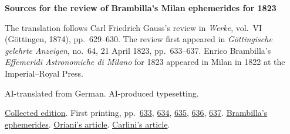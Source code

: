 \clearpage\thispagestyle{empty}
\begin{center}\Large\bfseries Sources for the review of Brambilla’s Milan ephemerides for 1823\end{center}

The translation follows Carl Friedrich Gauss’s review in \emph{Werke}, vol.~VI (Göttingen, 1874), pp.~629--630. The review first appeared in \emph{Göttingische gelehrte Anzeigen}, no.~64, 21 April 1823, pp.~633--637. Enrico Brambilla’s \emph{Effemeridi Astronomiche di Milano} for 1823 appeared in Milan in 1822 at the Imperial--Royal Press.

AI-translated from German. AI-produced typesetting.

\href{https://gdz.sub.uni-goettingen.de/id/PPN236007467}{Collected edition}. First printing, pp.~\href{https://images.p.sub.uni-goettingen.de/iiif/image/gdz:PPN385030444_1823_1:00000639/full/1650,/0/default.jpg}{633}, \href{https://images.p.sub.uni-goettingen.de/iiif/image/gdz:PPN385030444_1823_1:00000640/full/1650,/0/default.jpg}{634}, \href{https://images.p.sub.uni-goettingen.de/iiif/image/gdz:PPN385030444_1823_1:00000641/full/1650,/0/default.jpg}{635}, \href{https://images.p.sub.uni-goettingen.de/iiif/image/gdz:PPN385030444_1823_1:00000642/full/1650,/0/default.jpg}{636}, \href{https://images.p.sub.uni-goettingen.de/iiif/image/gdz:PPN385030444_1823_1:00000643/full/1650,/0/default.jpg}{637}. \href{https://books.google.it/books?id=yKIAAAAAMAAJ&pg=PP5}{Brambilla’s ephemerides}. \href{https://books.google.it/books?id=yKIAAAAAMAAJ&pg=RA1-PA3}{Oriani’s article}. \href{https://books.google.it/books?id=yKIAAAAAMAAJ&pg=RA1-PA27}{Carlini’s article}.

\clearpage
